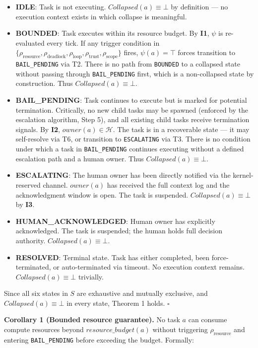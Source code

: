 \begin{itemize}
\item \textbf{IDLE}: Task is not executing. $Collapsed(a) \equiv \bot$ by definition — no execution context exists in which collapse is meaningful.
\item \textbf{BOUNDED}: Task executes within its resource budget. By \textbf{I1}, $\psi$ is re-evaluated every tick. If any trigger condition in $\{\rho_\text{resource}, \rho_\text{deadlock}, \rho_\text{loop}, \rho_\text{trust}, \rho_\text{scope}\}$ fires, $\psi(a) = \top$ forces transition to \texttt{BAIL\_PENDING} via T2. There is no path from \texttt{BOUNDED} to a collapsed state without passing through \texttt{BAIL\_PENDING} first, which is a non-collapsed state by construction. Thus $Collapsed(a) \equiv \bot$.
\item \textbf{BAIL\_PENDING}: Task continues to execute but is marked for potential termination. Critically, no new child tasks may be spawned (enforced by the escalation algorithm, Step 5), and all existing child tasks receive termination signals. By \textbf{I2}, $owner(a) \in \mathcal{H}$. The task is in a recoverable state — it may self-resolve via T6, or transition to \texttt{ESCALATING} via T3. There is no condition under which a task in \texttt{BAIL\_PENDING} continues executing without a defined escalation path and a human owner. Thus $Collapsed(a) \equiv \bot$.
\item \textbf{ESCALATING}: The human owner has been directly notified via the kernel-reserved channel. $owner(a)$ has received the full context log and the acknowledgment window is open. The task is suspended. $Collapsed(a) \equiv \bot$ by \textbf{I3}.
\item \textbf{HUMAN\_ACKNOWLEDGED}: Human owner has explicitly acknowledged. The task is suspended; the human holds full decision authority. $Collapsed(a) \equiv \bot$.
\item \textbf{RESOLVED}: Terminal state. Task has either completed, been force-terminated, or auto-terminated via timeout. No execution context remains. $Collapsed(a) \equiv \bot$ trivially.
\end{itemize}

Since all six states in $S$ are exhaustive and mutually exclusive, and $Collapsed(a) \equiv \bot$ in every state, Theorem 1 holds. $\square$

\bigskip
\noindent\textbf{Corollary 1 (Bounded resource guarantee).} No task $a$ can consume compute resources beyond $resource\_budget(a)$ without triggering $\rho_\text{resource}$ and entering \texttt{BAIL\_PENDING} before exceeding the budget. Formally:

